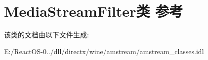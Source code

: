 \hypertarget{class_media_stream_filter}{}\section{Media\+Stream\+Filter类 参考}
\label{class_media_stream_filter}


该类的文档由以下文件生成\+:\begin{DoxyCompactItemize}
\item 
E\+:/\+React\+O\+S-\/0../dll/directx/wine/amstream/amstream\+\_\+classes.\+idl\end{DoxyCompactItemize}
